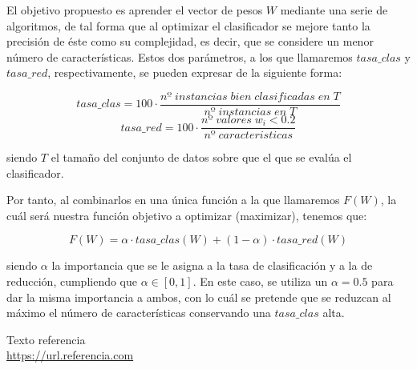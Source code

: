 \documentclass[11pt,a4paper]{article}
\begin{document}
El objetivo propuesto es aprender el vector de pesos $W$
mediante una serie de algoritmos, de tal forma que al optimizar el clasificador se mejore tanto la precisión de éste como su
complejidad, es decir, que se considere un menor número de características. Estos dos parámetros, a los que llamaremos $tasa\_
clas$ y $tasa\_red$, respectivamente, se pueden expresar de la siguiente forma:

\[tasa\_clas = 100 \cdot \frac{nº \; instancias \; bien \; clasificadas \; en \; T}{nº \; instancias \; en \; T}\]
\[tasa\_red = 100 \cdot \frac{nº \; valores \; w_i < 0.2}{nº \; caracteristicas}\]

\noindent siendo $T$ el tamaño del conjunto de datos sobre que el que se evalúa el clasificador.\par

Por tanto, al combinarlos en una única función a la que llamaremos $F(W)$, la cuál será nuestra función objetivo a optimizar
(maximizar), tenemos que:

\[F(W) = \alpha \cdot tasa\_clas(W) + (1 - \alpha) \cdot tasa\_red(W)\] 

\noindent siendo $\alpha$ la importancia que se le asigna a la tasa de clasificación y a la de reducción, cumpliendo que
$\alpha \in [0, 1]$. En este caso, se utiliza un $\alpha = 0.5$ para dar la misma importancia a ambos, con lo cuál se pretende
que se reduzcan al máximo el número de características conservando una $tasa\_clas$ alta.

\newpage

\begin{thebibliography}{5}

Texto referencia
\\\url{https://url.referencia.com}

\end{thebibliography}
\end{document}
